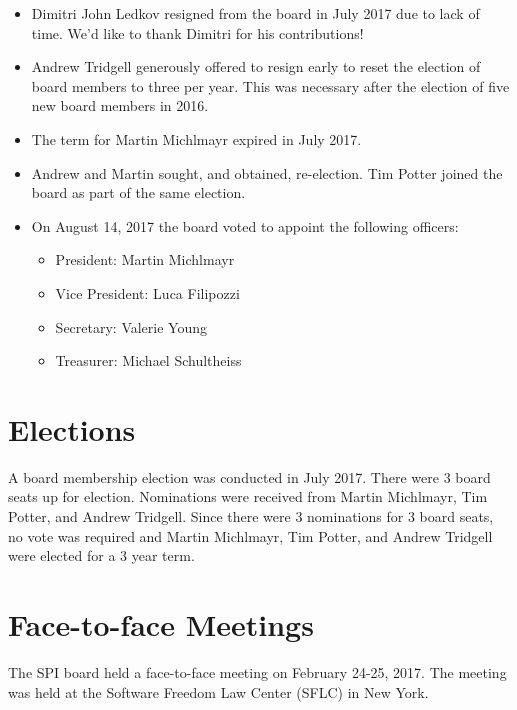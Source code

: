 \documentclass[a4paper]{report}
\begin{document}
\begin{itemize}

\item Dimitri John Ledkov resigned from the board in July 2017 due to lack
of time.  We'd like to thank Dimitri for his contributions!

\item Andrew Tridgell generously offered to resign early to reset the
election of board members to three per year. This was necessary after the
election of five new board members in 2016.

\item The term for Martin Michlmayr expired in July 2017.

\item Andrew and Martin sought, and obtained, re-election.  Tim Potter
joined the board as part of the same election.

\item On August 14, 2017 the board voted to appoint the following
officers:

\begin{itemize}
\item President: Martin Michlmayr
\item Vice President: Luca Filipozzi
\item Secretary: Valerie Young
\item Treasurer: Michael Schultheiss
\end{itemize}

\end{itemize}

\section{Elections}

A board membership election was conducted in July 2017.  There were 3 board
seats up for election.  Nominations were received from Martin Michlmayr,
Tim Potter, and Andrew Tridgell.  Since there were 3 nominations for 3
board seats, no vote was required and Martin Michlmayr, Tim Potter, and
Andrew Tridgell were elected for a 3 year term.

\section{Face-to-face Meetings}

The SPI board held a face-to-face meeting on February 24-25, 2017.
The meeting was held at the Software Freedom Law Center (SFLC) in New
York.
\end{document}
